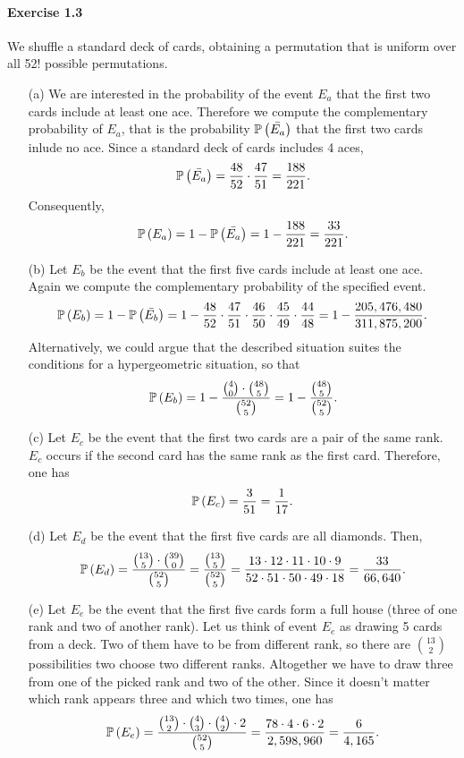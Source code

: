 \paragraph{Exercise 1.3} We shuffle a standard deck of cards, obtaining a permutation
that is uniform over all 52! possible permutations.
\begin{enumerate}
  \item[(a)] We are interested in the probability of the event $E_a$ that the
    first two cards include at least one ace. Therefore we compute the complementary
    probability of $E_a$, that is the probability $\mathbb{P}\left(\bar{E_a}\right)$
    that the first two cards inlude no ace. Since a standard deck of cards
    includes 4 aces,
    \[ \mathbb{P}\left(\bar{E_a}\right) = \frac{48}{52} \cdot \frac{47}{51} = \frac{188}{221}.\]
    Consequently,
    \[ \mathbb{P}\left(E_a\right) = 1 - \mathbb{P}\left(\bar{E_a}\right) = 1 - \frac{188}{221} = \frac{33}{221}.\]

  \item[(b)] Let $E_b$ be the event that the first five cards include at least one
    ace. Again we compute the complementary probability of the specified event.
    \[
      \mathbb{P}\left(E_b\right)
        = 1 - \mathbb{P}\left(\bar{E_b}\right)
        = 1 - \frac{48}{52} \cdot \frac{47}{51} \cdot \frac{46}{50} \cdot \frac{45}{49} \cdot \frac{44}{48}
        = 1 - \frac{205,476,480}{311,875,200}.
    \]
    Alternatively, we could argue that the described situation suites the conditions
    for a hypergeometric situation, so that
    \[
      \mathbb{P}\left(E_b\right)
        = 1 - \frac{\binom{4}{0} \cdot \binom{48}{5}}{\binom{52}{5}}
        = 1 - \frac{\binom{48}{5}}{\binom{52}{5}}.
    \]

  \item[(c)] Let $E_c$ be the event that the first two cards are a pair of the
    same rank.  $E_c$ occurs if the second card has the same rank as the first
    card. Therefore, one has
    \[ \mathbb{P}\left(E_c\right) = \frac{3}{51} = \frac{1}{17}.\]

  \item[(d)] Let $E_d$ be the event that the first five cards are all diamonds. Then,
    \[
      \mathbb{P}\left(E_d\right)
        = \frac{\binom{13}{5} \cdot \binom{39}{0}}{\binom{52}{5}}
        = \frac{\binom{13}{5}}{\binom{52}{5}}
        = \frac{13 \cdot 12 \cdot 11 \cdot 10 \cdot 9}{52 \cdot 51 \cdot 50 \cdot 49 \cdot 18}
        = \frac{33}{66,640}.
    \]

  \item[(e)] Let $E_e$ be the event that the first five cards form a full house
    (three of one rank and two of another rank). Let us think of event $E_e$ as
    drawing 5 cards from a deck. Two of them have to be from different rank, so
    there are $\binom{13}{2}$ possibilities two choose two different ranks.
    Altogether we have to draw three from one of the picked rank and two of the
    other. Since it doesn't matter which rank appears three and which two times,
    one has
    \[
      \mathbb{P}\left(E_e\right)
        = \frac{\binom{13}{2} \cdot \binom{4}{3} \cdot \binom{4}{2} \cdot 2}{\binom{52}{5}}
        = \frac{78 \cdot 4 \cdot 6 \cdot 2}{2,598,960}
        = \frac{6}{4,165}.
    \]
\end{enumerate}
